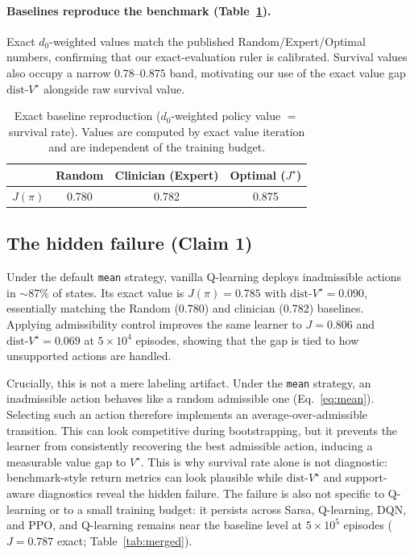 \documentclass{article}
\newcommand{\dist}{\mathrm{dist}\text{-}V^\star}
\begin{document}
\paragraph{Baselines reproduce the benchmark (Table~\ref{tab:baselines}).}
Exact $d_0$-weighted values match the published Random/Expert/Optimal numbers,
confirming that our exact-evaluation ruler is calibrated. Survival values also
occupy a narrow $0.78$--$0.875$ band, motivating our use of the exact value gap
$\dist$ alongside raw survival value.

\begin{table}[t]
\centering
\caption{Exact baseline reproduction ($d_0$-weighted policy value $=$ survival
rate). Values are computed by exact value iteration and are independent of the
training budget.}
\label{tab:baselines}
\begin{tabular}{lccc}
\toprule
 & Random & Clinician (Expert) & Optimal ($J^\star$) \\
\midrule
$J(\pi)$ & 0.780 & 0.782 & 0.875 \\
\bottomrule
\end{tabular}
\end{table}

\subsection{The hidden failure (Claim 1)}
\label{sec:failure}
Under the default \texttt{mean} strategy, vanilla Q-learning deploys
inadmissible actions in $\sim$87\% of states. Its exact value is
$J(\pi){=}0.785$ with $\dist{=}0.090$, essentially matching the Random
(0.780) and clinician (0.782) baselines. Applying admissibility control improves
the same learner to $J{=}0.806$ and $\dist{=}0.069$ at $5{\times}10^4$
episodes, showing that the gap is tied to
how unsupported actions are handled.

Crucially, this is not a mere labeling artifact. Under the \texttt{mean}
strategy, an inadmissible action behaves like a random admissible one
(Eq.~\eqref{eq:mean}). Selecting such an action therefore implements an
average-over-admissible transition. This can look competitive during
bootstrapping, but it prevents the learner from consistently recovering the best
admissible action, inducing a measurable value gap to $V^\star$. This is why
survival rate alone is not diagnostic: benchmark-style return metrics can look
plausible while $\dist$ and support-aware diagnostics reveal the hidden failure. The failure is also not specific to Q-learning or to a
small training budget: it persists across Sarsa, Q-learning, DQN, and PPO, and Q-learning remains
near the baseline level at $5{\times}10^5$ episodes ($J{=}0.787$ exact;
Table~\ref{tab:merged}).
\end{document}
